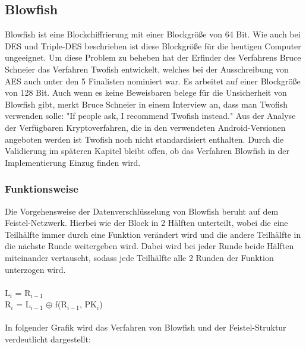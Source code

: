 \documentclass[10pt, a4paper,headsepline]{scrreprt}
\begin{document}
\subsection{Blowfish}
Blowfish ist eine Blockchiffrierung mit einer Blockgröße von 64 Bit. Wie auch bei DES und Triple-DES beschrieben ist diese Blockgröße für die heutigen Computer ungeeignet. Um diese Problem zu beheben hat der Erfinder des Verfahrens Bruce Schneier das Verfahren Twofish entwickelt, welches bei der Ausschreibung von AES auch unter den 5 Finalisten nominiert war. Es arbeitet auf einer Blockgröße von 128 Bit. Auch wenn es keine Beweisbaren belege für die Unsicherheit von Blowfish gibt, merkt Bruce Schneier in einem Interview an, dass man Twofish verwenden solle: "If people ask, I recommend Twofish instead." \cite{website:compworld-schneier}
Aus der Analyse der Verfügbaren Kryptoverfahren, die in den verwendeten Android-Versionen angeboten werden ist Twofish noch nicht standardisiert enthalten. Durch die Validierung im späteren Kapitel bleibt offen, ob das Verfahren Blowfish in der Implementierung Einzug finden wird.

\subsubsection{Funktionsweise}
Die Vorgehensweise der Datenverschlüsselung von Blowfish beruht auf dem Feistel-Netzwerk. Hierbei wie der Block in 2 Hälften unterteilt, wobei die eine Teilhälfte immer durch eine Funktion verändert wird und die andere Teilhälfte in die nächste Runde weitergeben wird. Dabei wird bei jeder Runde beide Hälften miteinander vertauscht, sodass jede Teilhälfte alle 2 Runden der Funktion unterzogen wird. \\ \\
L$_{i}$ = R$_{i-1}$ \\
R$_{i}$ = L$_{i-1}$ $\oplus$ f(R$_{i-1}$, PK$_{i}$) \\ \\
In folgender Grafik wird das Verfahren von Blowfish und der Feistel-Struktur verdeutlicht dargestellt: \\ \\
\end{document}
